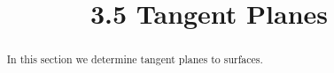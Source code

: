 \documentclass[handout]{ximera}
\title{3.5 Tangent Planes}
\begin{document}
\begin{abstract}
In this section we determine tangent planes to surfaces.
\end{abstract}

\maketitle
\end{document}
